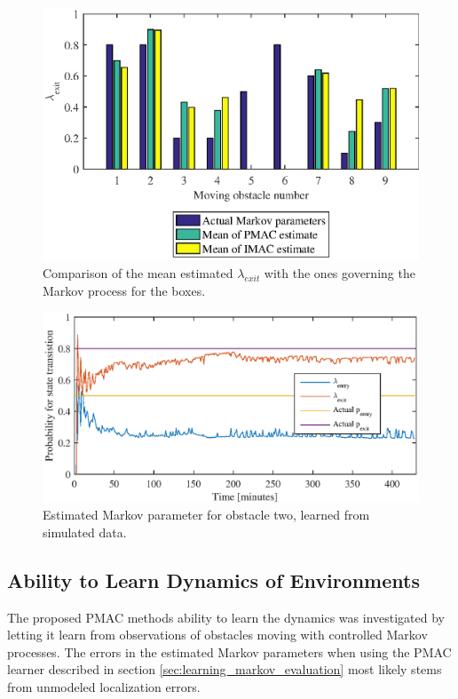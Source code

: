 \begin{figure}
    \centering
    \includegraphics[scale=1]{chapters/evaluation/figures/compare_learned_markov_exit}
    \caption{Comparison of the mean estimated $\lambda_{exit}$ with the ones governing the Markov process for the boxes.}
    \label{fig:compare_learned_markov_exit}
\end{figure}

\begin{figure}
	\centering
	\includegraphics[scale=1]{chapters/evaluation/figures/learning_curve}
	\caption{Estimated Markov parameter for obstacle two, learned from simulated data.}
	\label{fig:learning_curve}
\end{figure}



\subsection{Ability to Learn Dynamics of Environments}
The proposed PMAC methods ability to learn the dynamics was investigated by letting it learn from observations of obstacles moving with controlled Markov processes.
The errors in the estimated Markov parameters when using the PMAC learner described in section \ref{sec:learning_markov_evaluation} most likely stems from unmodeled localization errors. 

